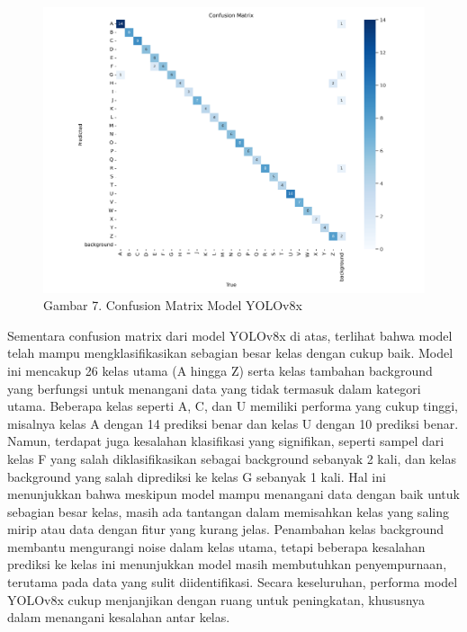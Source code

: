 \documentclass[12pt,a4paper]{article}
\begin{document}
\begin{figure}[h]
    \centering
    \includegraphics[width=0.6\linewidth]{Images/Gambar7Matrix.png}
    \caption*{Gambar 7. Confusion Matrix Model YOLOv8x}
    \label{fig:enter-label}
\end{figure}
\begin{adjustwidth}{3em}{0pt}
\hspace{0.5cm} Sementara confusion matrix dari model YOLOv8x di atas, terlihat bahwa model telah mampu mengklasifikasikan sebagian besar kelas dengan cukup baik. Model ini mencakup 26 kelas utama (A hingga Z) serta kelas tambahan background yang berfungsi untuk menangani data yang tidak termasuk dalam kategori utama. Beberapa kelas seperti A, C, dan U memiliki performa yang cukup tinggi, misalnya kelas A dengan 14 prediksi benar dan kelas U dengan 10 prediksi benar. Namun, terdapat juga kesalahan klasifikasi yang signifikan, seperti sampel dari kelas F yang salah diklasifikasikan sebagai background sebanyak 2 kali, dan kelas background yang salah diprediksi ke kelas G sebanyak 1 kali. Hal ini menunjukkan bahwa meskipun model mampu menangani data dengan baik untuk sebagian besar kelas, masih ada tantangan dalam memisahkan kelas yang saling mirip atau data dengan fitur yang kurang jelas. Penambahan kelas background membantu mengurangi noise dalam kelas utama, tetapi beberapa kesalahan prediksi ke kelas ini menunjukkan model masih membutuhkan penyempurnaan, terutama pada data yang sulit diidentifikasi. Secara keseluruhan, performa model YOLOv8x cukup menjanjikan dengan ruang untuk peningkatan, khususnya dalam menangani kesalahan antar kelas.
\end{adjustwidth}
\end{document}
